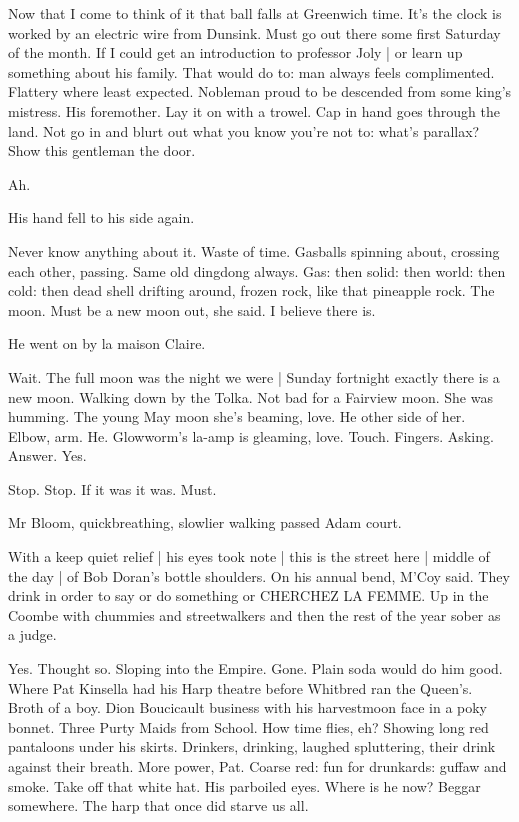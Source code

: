 Now that I come to think of it 
that ball falls at Greenwich time.
It's the clock is worked by an electric wire from Dunsink.
Must go out there
some first Saturday of the month.
If I could get an introduction to professor Joly |
or learn up something about his family.
That would do to:
man always feels complimented.
Flattery where least expected.
Nobleman proud to be descended from some king's mistress.
His foremother.
Lay it on with a trowel.
Cap in hand goes through the land.
Not go in and blurt out what you know you're not to:
what's parallax?
Show this gentleman the door.

Ah.

His hand fell to his side again.

Never know anything about it.
Waste of time.
Gasballs spinning about,
crossing each other,
passing.
Same old dingdong always.
Gas:
then solid:
then world:
then cold:
then dead shell drifting around,
frozen rock,
like that pineapple rock.
The moon.
Must be a new moon out,
she said.
I believe there is.

He went on by la maison Claire.

Wait.
The full moon was the night we were |
Sunday fortnight exactly there is a new moon.
Walking down by the Tolka.
Not bad for a Fairview moon.
She was humming.
The young May moon she's beaming,
love.
He other side of her.
Elbow, arm.
He.
Glowworm's la-amp is gleaming, love.
Touch.
Fingers.
Asking.
Answer.
Yes.

Stop.
Stop.
If it was it was.
Must.

Mr Bloom, quickbreathing,
slowlier walking passed Adam court.

With a keep quiet relief |
his eyes took note |
this is the street here |
middle of the day |
of Bob Doran's bottle shoulders.
On his annual bend,
M'Coy said.
They drink in order to say or do something or
CHERCHEZ LA FEMME.
Up in the Coombe with chummies and streetwalkers
and then the rest of the year sober as a judge.

Yes.
Thought so.
Sloping into the Empire.
Gone.
Plain soda would do him good.
Where Pat Kinsella had his Harp theatre
before Whitbred ran the Queen's.
Broth of a boy.
Dion Boucicault business with his harvestmoon face in a poky bonnet.
Three Purty Maids from School.
How time flies, eh?
Showing long red pantaloons under his skirts.
Drinkers, drinking, laughed spluttering,
their drink against their breath.
More power, Pat.
Coarse red:
fun for drunkards:
guffaw and smoke.
Take off that white hat.
His parboiled eyes.
Where is he now?
Beggar somewhere.
The harp that once did starve us all.

